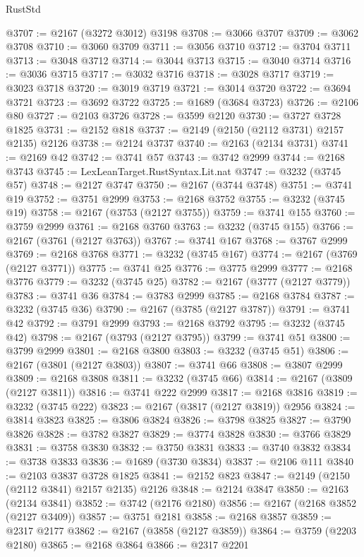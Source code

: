 \begin{lexlean}{RustStd}
\begin{coremodule}
@3707 := @2167 (@3272 @3012) @3198
@3708 := @3066 @3707
@3709 := @3062 @3708
@3710 := @3060 @3709
@3711 := @3056 @3710
@3712 := @3704 @3711
@3713 := @3048 @3712
@3714 := @3044 @3713
@3715 := @3040 @3714
@3716 := @3036 @3715
@3717 := @3032 @3716
@3718 := @3028 @3717
@3719 := @3023 @3718
@3720 := @3019 @3719
@3721 := @3014 @3720
@3722 := @3694 @3721
@3723 := @3692 @3722
@3725 := @1689 (@3684 @3723)
@3726 := @2106 @80
@3727 := @2103 @3726
@3728 := @3599 @2120
@3730 := @3727 @3728 @1825
@3731 := @2152 @818
@3737 := @2149 (@2150 (@2112 @3731) @2157 @2135) @2126
@3738 := @2124 @3737
@3740 := @2163 (@2134 @3731)
@3741 := @2169 @42
@3742 := @3741 @57
@3743 := @3742 @2999
@3744 := @2168 @3743
@3745 := LexLeanTarget.RustSyntax.Lit.nat
@3747 := @3232 (@3745 @57)
@3748 := @2127 @3747
@3750 := @2167 (@3744 @3748)
@3751 := @3741 @19
@3752 := @3751 @2999
@3753 := @2168 @3752
@3755 := @3232 (@3745 @19)
@3758 := @2167 (@3753 (@2127 @3755))
@3759 := @3741 @155
@3760 := @3759 @2999
@3761 := @2168 @3760
@3763 := @3232 (@3745 @155)
@3766 := @2167 (@3761 (@2127 @3763))
@3767 := @3741 @167
@3768 := @3767 @2999
@3769 := @2168 @3768
@3771 := @3232 (@3745 @167)
@3774 := @2167 (@3769 (@2127 @3771))
@3775 := @3741 @25
@3776 := @3775 @2999
@3777 := @2168 @3776
@3779 := @3232 (@3745 @25)
@3782 := @2167 (@3777 (@2127 @3779))
@3783 := @3741 @36
@3784 := @3783 @2999
@3785 := @2168 @3784
@3787 := @3232 (@3745 @36)
@3790 := @2167 (@3785 (@2127 @3787))
@3791 := @3741 @42
@3792 := @3791 @2999
@3793 := @2168 @3792
@3795 := @3232 (@3745 @42)
@3798 := @2167 (@3793 (@2127 @3795))
@3799 := @3741 @51
@3800 := @3799 @2999
@3801 := @2168 @3800
@3803 := @3232 (@3745 @51)
@3806 := @2167 (@3801 (@2127 @3803))
@3807 := @3741 @66
@3808 := @3807 @2999
@3809 := @2168 @3808
@3811 := @3232 (@3745 @66)
@3814 := @2167 (@3809 (@2127 @3811))
@3816 := @3741 @222 @2999
@3817 := @2168 @3816
@3819 := @3232 (@3745 @222)
@3823 := @2167 (@3817 (@2127 @3819)) @2956
@3824 := @3814 @3823
@3825 := @3806 @3824
@3826 := @3798 @3825
@3827 := @3790 @3826
@3828 := @3782 @3827
@3829 := @3774 @3828
@3830 := @3766 @3829
@3831 := @3758 @3830
@3832 := @3750 @3831
@3833 := @3740 @3832
@3834 := @3738 @3833
@3836 := @1689 (@3730 @3834)
@3837 := @2106 @111
@3840 := @2103 @3837 @3728 @1825
@3841 := @2152 @823
@3847 := @2149 (@2150 (@2112 @3841) @2157 @2135) @2126
@3848 := @2124 @3847
@3850 := @2163 (@2134 @3841)
@3852 := @3742 (@2176 @2180)
@3856 := @2167 (@2168 @3852 (@2127 @3409))
@3857 := @3751 @2181
@3858 := @2168 @3857
@3859 := @2317 @2177
@3862 := @2167 (@3858 (@2127 @3859))
@3864 := @3759 (@2203 @2180)
@3865 := @2168 @3864
@3866 := @2317 @2201

\end{coremodule}
\end{lexlean}
